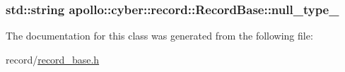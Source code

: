 \hypertarget{classapollo_1_1cyber_1_1record_1_1RecordBase_a57cd95944aa2d3ddc216d3e9539db590}{
\subsubsection[{null\-\_\-type\-\_\-}]{\setlength{\rightskip}{0pt plus 5cm}std\-::string apollo\-::cyber\-::record\-::\-Record\-Base\-::null\-\_\-type\-\_\-\hspace{0.3cm}{\ttfamily [protected]}}}\label{classapollo_1_1cyber_1_1record_1_1RecordBase_a57cd95944aa2d3ddc216d3e9539db590}


The documentation for this class was generated from the following file\-:\begin{DoxyCompactItemize}
\item 
record/\hyperlink{record__base_8h}{record\-\_\-base.\-h}\end{DoxyCompactItemize}
